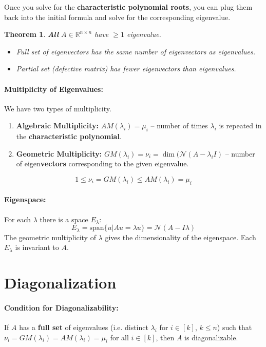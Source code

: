 \documentclass[a4paper,12pt]{report}
\def\reals{\mathbb{R}}
\newtheorem{theorem}{Theorem}
\begin{document}
Once you solve for the \textbf{characteristic polynomial roots}, you can plug them back into the initial formula and solve for the corresponding eigenvalue.

\begin{theorem}
\textbf{All} $A\in\reals^{n\times n}$ have $\geq 1$ eigenvalue.
\begin{itemize}
\item Full set of eigenvectors has the same number of eigenvectors as eigenvalues.
\item Partial set (defective matrix) has fewer eigenvectors than eigenvalues.
\end{itemize}
\end{theorem}

\paragraph{Multiplicity of Eigenvalues: } We have two types of multiplicity.
\begin{enumerate}
\item \textbf{Algebraic Multiplicity: } $AM(\lambda_i) = \mu_i$ -- number of times $\lambda_i$ is repeated in the \textbf{characteristic polynomial}.
\item \textbf{Geometric Multiplicity: } $GM(\lambda_i) = \nu_i = \dim(\mathcal{N}(A-\lambda_i I)$ -- number of eigen\textbf{vectors} corresponding to the given eigenvalue.
\end{enumerate}

$$1 \leq \nu_i = GM(\lambda_i) \leq AM(\lambda_i) = \mu_i$$

\paragraph{Eigenspace: } For each $\lambda$ there is a space $E_\lambda$: 
\begin{equation}
	E_{\lambda} = \text{span}\{u|Au = \lambda u\} = \mathcal{N}(A-I\lambda)
\end{equation}
The geometric multiplicity of $\lambda$ gives the dimensionality of the eigenspace. Each $E_\lambda$ is invariant to $A$.

\section{Diagonalization}

\paragraph{Condition for Diagonalizability: } If $A$ has a \textbf{full set} of eigenvalues (i.e. distinct $\lambda_i$ for $i\in[k]$, $k \leq n$) such that $\nu_i = GM(\lambda_i) = AM(\lambda_i) = \mu_i$ for all $i \in [k]$, then $A$ is diagonalizable.
\end{document}
